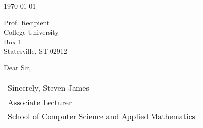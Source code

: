 \documentclass[11pt]{article}
\begin{document}
\subject{Hello world}
\signature{}  %

\thispagestyle{firstpage}

\witsletterhead

\begin{rightbox}
\today
\end{rightbox}

\bigskip

\begin{leftbox}
  Prof. Recipient \\
  College University \\
  Box 1 \\
  Statesville, ST 02912
\end{leftbox}

\medskip

Dear Sir,

\subjectline

\medskip

\lipsum [10]

\medskip

\begin{tabular}{@{} p{\linewidth} @{}}
  Sincerely, 
  \signatureline		
  Steven James \\
  Associate Lecturer \\
  School of Computer Science and Applied Mathematics  
\end{tabular}
\end{document}
